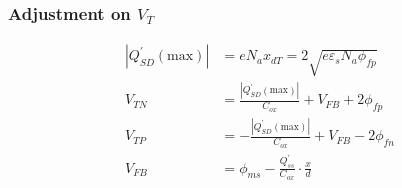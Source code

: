 \documentclass{beamer}
\begin{document}
    \begin{frame} \frametitle{Adjustment on $V_T$}
        \begin{equation*}
            \boxed{
            \begin{aligned}
                \left| Q^\prime_{SD} (\text{max}) \right| &= eN_a x_{dT} = 2 \sqrt{e \varepsilon_s N_a \phi_{fp} } \\
                V_{TN} &= \frac{\left| Q^\prime_{SD} (\text{max}) \right|}{C_{ox} } + V_{FB} + 2 \phi_{fp}  \\
                V_{TP} &= - \frac{\left| Q^\prime_{SD} (\text{max}) \right|}{C_{ox} } + V_{FB} - 2 \phi_{fn}  \\
                V_{FB} &= \phi_{ms} - \frac{Q^\prime_{ss} }{C_{ox}}\cdot \frac{x}{d} 
            \end{aligned}
            }
        \end{equation*}
    \end{frame}
\end{document}
